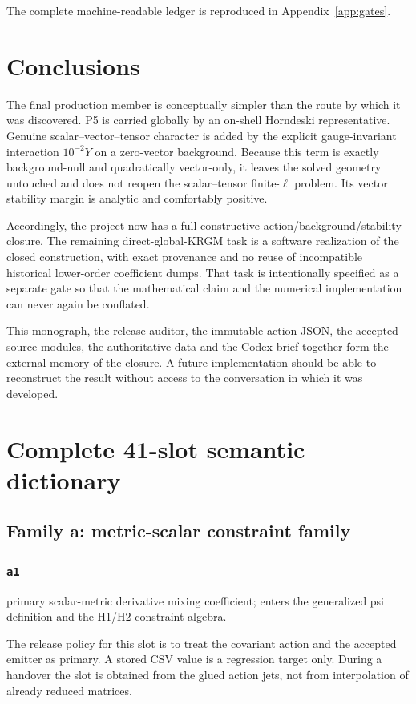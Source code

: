 \documentclass[11pt,a4paper,oneside]{book}
\begin{document}
The complete machine-readable ledger is reproduced in Appendix~\ref{app:gates}.

\chapter{Conclusions}
The final production member is conceptually simpler than the route by which it was discovered. P5 is carried globally by an on-shell Horndeski representative. Genuine scalar--vector--tensor character is added by the explicit gauge-invariant interaction $10^{-2}Y$ on a zero-vector background. Because this term is exactly background-null and quadratically vector-only, it leaves the solved geometry untouched and does not reopen the scalar--tensor finite-$\ell$ problem. Its vector stability margin is analytic and comfortably positive.

Accordingly, the project now has a full constructive action/background/stability closure. The remaining direct-global-KRGM task is a software realization of the closed construction, with exact provenance and no reuse of incompatible historical lower-order coefficient dumps. That task is intentionally specified as a separate gate so that the mathematical claim and the numerical implementation can never again be conflated.

This monograph, the release auditor, the immutable action JSON, the accepted source modules, the authoritative data and the Codex brief together form the external memory of the closure. A future implementation should be able to reconstruct the result without access to the conversation in which it was developed.
\appendix
\chapter{Complete 41-slot semantic dictionary}\label{app:slots}
\section{Family a: metric-scalar constraint family}
\subsection{\texttt{a1}}
primary scalar-metric derivative mixing coefficient; enters the generalized psi definition and the H1/H2 constraint algebra.

The release policy for this slot is to treat the covariant action and the accepted emitter as primary. A stored CSV value is a regression target only. During a handover the slot is obtained from the glued action jets, not from interpolation of already reduced matrices.\par
\end{document}
